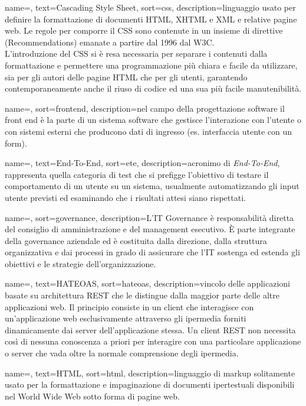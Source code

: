 {
	name=,
	text=Cascading Style Sheet,
	sort=css,
	description={linguaggio usato per definire la formattazione di documenti HTML, XHTML e XML e relative pagine web. Le regole per comporre il CSS sono contenute in un insieme di direttive (Recommendations) emanate a partire dal 1996 dal W3C.\\
L'introduzione del CSS si è resa necessaria per separare i contenuti dalla formattazione e permettere una programmazione più chiara e facile da utilizzare, sia per gli autori delle pagine HTML che per gli utenti, garantendo contemporaneamente anche il riuso di codice ed una sua più facile manutenibilità.}
}

{
	name=,
	sort=frontend,
	description={nel campo della progettazione software il front end è la parte di un sistema software che gestisce l'interazione con l'utente o con sistemi esterni che producono dati di ingresso (es. interfaccia utente con un form).}
}

{
	name=,
	text=End-To-End,
	sort=ete,
	description={acronimo di \emph{End-To-End}, rappresenta quella categoria di test che si prefigge l'obiettivo di testare il comportamento di un utente su un sistema, usualmente automatizzando gli input utente previsti ed esaminando che i risultati attesi siano rispettati.}
}

{
	name=,
	sort=governance,
	description={L'IT Governance è responsabilità diretta del consiglio di amministrazione e del management esecutivo. \`{E} parte integrante della governance aziendale ed è costituita dalla direzione, dalla struttura organizzativa e dai processi in grado di assicurare che l'IT sostenga ed estenda gli obiettivi e le strategie dell'organizzazione.}
}

{
	name=,
	text=HATEOAS,
	sort=hateoas,
	description={vincolo delle applicazioni basate su architettura REST che le distingue dalla maggior parte delle altre applicazioni web. Il principio consiste in un client che interagisce con un'applicazione web esclusivamente attraverso gli ipermedia forniti dinamicamente dai server dell'applicazione stessa. Un client REST non necessita così di nessuna conoscenza a priori per interagire con una particolare applicazione o server che vada oltre la normale comprensione degli ipermedia.}
}

{
	name=,
	text=HTML,
	sort=html,
	description={linguaggio di markup solitamente usato per la formattazione e impaginazione di documenti ipertestuali disponibili nel World Wide Web sotto forma di pagine web.}
}

